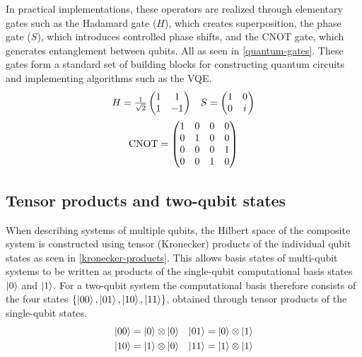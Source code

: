 In practical implementations, these operators are realized through elementary gates such as the Hadamard gate ($H$), which creates superposition, the phase gate ($S$), which introduces controlled phase shifts, and the CNOT gate, which generates entanglement between qubits. All as seen in \cref{quantum-gates}. These gates form a standard set of building blocks for constructing quantum circuits and implementing algorithms such as the VQE.
\begin{equation}\label{quantum-gates}
\begin{array}{cc}
H = \frac{1}{\sqrt{2}}
\begin{pmatrix}
1 & 1\\
1 & -1
\end{pmatrix}
&
S =
\begin{pmatrix}
1 & 0\\
0 & i
\end{pmatrix}
\\[12pt]
\multicolumn{2}{c}{
\text{CNOT} =
\begin{pmatrix}
1 & 0 & 0 & 0\\
0 & 1 & 0 & 0\\
0 & 0 & 0 & 1\\
0 & 0 & 1 & 0
\end{pmatrix}}
\end{array}
\end{equation}

\subsection{Tensor products and two-qubit states}
When describing systems of multiple qubits, the Hilbert space of the composite system is constructed using tensor (Kronecker) products of the individual qubit states as seen in \cref{kronecker-products}. This allows basis states of multi-qubit systems to be written as products of the single-qubit computational basis states $\left| 0 \right\rangle$ and $\left| 1 \right\rangle$. For a two-qubit system the computational basis therefore consists of the four states $\{\left| 00 \right\rangle,\left| 01 \right\rangle,\left| 10 \right\rangle,\left| 11 \right\rangle\}$, obtained through tensor products of the single-qubit states.
\begin{equation}\label{kronecker-products}
\begin{aligned}
\left| 00 \right\rangle &= \left| 0 \right\rangle \otimes \left| 0 \right\rangle &
\left| 01 \right\rangle &= \left| 0 \right\rangle \otimes \left| 1 \right\rangle \\
\left| 10 \right\rangle &= \left| 1 \right\rangle \otimes \left| 0 \right\rangle &
\left| 11 \right\rangle &= \left| 1 \right\rangle \otimes \left| 1 \right\rangle
\end{aligned}
\end{equation}

